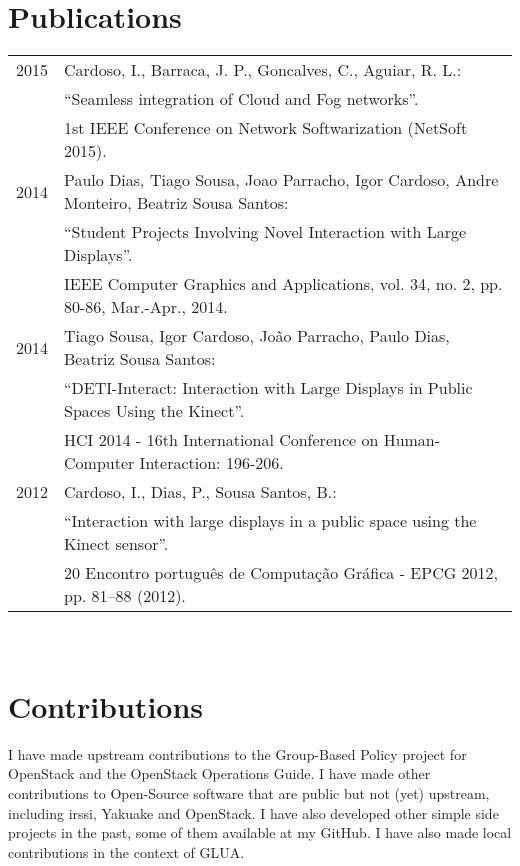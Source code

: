 \documentclass[letter,10pt]{article} %
\begin{document}
\section{Publications}
\begin{tabular}{rl}
\textsc{2015} & Cardoso, I., Barraca, J. P., Goncalves, C., Aguiar, R. L.: \\
& ``Seamless integration of Cloud and Fog networks''. \\
& 1st IEEE Conference on Network Softwarization (NetSoft 2015). \normalsize\\
\textsc{2014} & Paulo Dias, Tiago Sousa, Joao Parracho, Igor Cardoso, Andre Monteiro, Beatriz Sousa Santos: \\
& ``Student Projects Involving Novel Interaction with Large Displays''. \\
& IEEE Computer Graphics and Applications, vol. 34, no. 2, pp. 80-86, Mar.-Apr., 2014. \normalsize\\
\textsc{2014} & Tiago Sousa, Igor Cardoso, João Parracho, Paulo Dias, Beatriz Sousa Santos: \\
& ``DETI-Interact: Interaction with Large Displays in Public Spaces Using the Kinect''. \\
& HCI 2014 - 16th International Conference on Human-Computer Interaction: 196-206. \normalsize\\
\textsc{2012} & Cardoso, I., Dias, P., Sousa Santos, B.: \\
& ``Interaction with large displays in a public space using the Kinect sensor''. \\
& 20 Encontro português de Computação Gráfica - EPCG 2012, pp. 81–88 (2012).
\end{tabular} \\


\section{Contributions}
I have made upstream contributions to the Group-Based Policy project for OpenStack and the OpenStack Operations Guide. I have made other contributions to Open-Source software that are public but not (yet) upstream, including irssi, Yakuake and OpenStack. I have also developed other simple side projects in the past, some of them available at my GitHub. I have also made local contributions in the context of GLUA.
\end{document}
